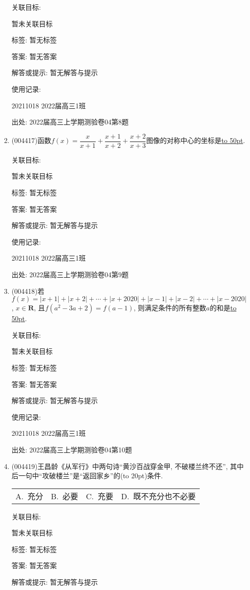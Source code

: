 \documentclass[10pt,a4paper]{article}
\newcommand{\blank}[1]{\underline{\hbox to #1pt{}}}
\newcommand{\bracket}[1]{(\hbox to #1pt{})}
\newcommand{\fourch}[4]{\par\begin{tabular}{p{.23\textwidth}p{.23\textwidth}p{.23\textwidth}p{.23\textwidth}}
A.~#1 &B.~#2& C.~#3& D.~#4
\end{tabular}}
\begin{document}
\begin{enumerate}[1.]
关联目标:

暂未关联目标



标签: 暂无标签

答案: 暂无答案

解答或提示: 暂无解答与提示

使用记录:

20211018	2022届高三1班	


出处: 2022届高三上学期测验卷04第8题
\item { (004417)}函数$f(x)=\dfrac x{x+1}+\dfrac{x+1}{x+2}+\dfrac{x+2}{x+3}$图像的对称中心的坐标是\blank{50}.


关联目标:

暂未关联目标



标签: 暂无标签

答案: 暂无答案

解答或提示: 暂无解答与提示

使用记录:

20211018	2022届高三1班	


出处: 2022届高三上学期测验卷04第9题
\item { (004418)}若$f(x)=|x+1|+|x+2|+\cdots +|x+2020|+|x-1|+|x-2|+\cdots +|x-2020|$, $x\in \mathbf{R}$, 且$f(a^2-3a+2)=f(a-1)$, 则满足条件的所有整数$a$的和是\blank{50}.


关联目标:

暂未关联目标



标签: 暂无标签

答案: 暂无答案

解答或提示: 暂无解答与提示

使用记录:

20211018	2022届高三1班	


出处: 2022届高三上学期测验卷04第10题
\item { (004419)}王昌龄《从军行》中两句诗``黄沙百战穿金甲, 不破楼兰终不还'', 其中后一句中``攻破楼兰''是``返回家乡''的\bracket{20}条件.
\fourch{充分}{必要}{充要}{既不充分也不必要}


关联目标:

暂未关联目标



标签: 暂无标签

答案: 暂无答案

解答或提示: 暂无解答与提示


\end{enumerate}
\end{document}
